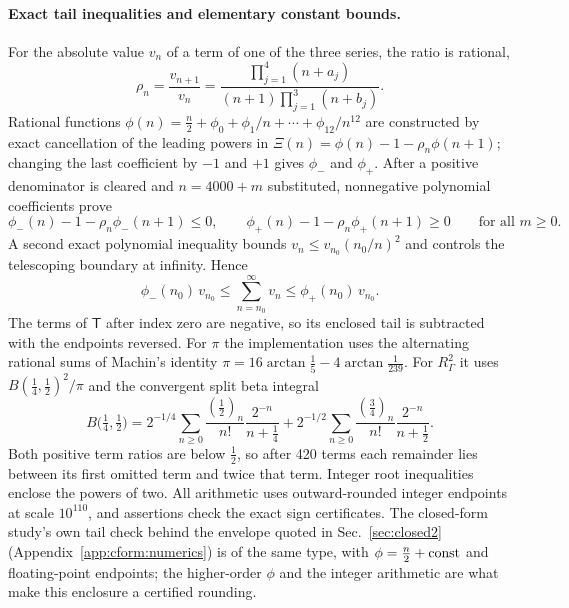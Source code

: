 \documentclass[11pt,a4paper]{article}
\numberwithin{equation}{section}
\begin{document}
\paragraph{Exact tail inequalities and elementary constant bounds.} For the absolute value $v_n$ of a term of one of
the three series, the ratio is rational,
\begin{equation}
 \rho_n=\frac{v_{n+1}}{v_n}=\frac{\prod_{j=1}^4(n+a_j)}{(n+1)\prod_{j=1}^3(n+b_j)}.
\end{equation}
Rational functions $\phi(n)=\frac n2+\phi_0+\phi_1/n+\cdots+\phi_{12}/n^{12}$ are constructed by exact cancellation of
the leading powers in $\Xi(n)=\phi(n)-1-\rho_n\phi(n+1)$; changing the last coefficient by $-1$ and $+1$ gives $\phi_-$
and $\phi_+$. After a positive denominator is cleared and $n=4000+m$ substituted, nonnegative polynomial coefficients
prove
\begin{equation}
 \phi_-(n)-1-\rho_n\phi_-(n+1)\le0,\qquad \phi_+(n)-1-\rho_n\phi_+(n+1)\ge0\qquad\text{for all }m\ge0.
\end{equation}
A second exact polynomial inequality bounds $v_n\le v_{n_0}(n_0/n)^2$ and controls the telescoping boundary at
infinity. Hence
\begin{equation}
 \phi_-(n_0)\,v_{n_0}\le\sum_{n=n_0}^\infty v_n\le\phi_+(n_0)\,v_{n_0}.
\end{equation}
The terms of $\mathsf T$ after index zero are negative, so its enclosed tail is subtracted with the endpoints reversed.
For $\pi$ the implementation uses the alternating rational sums of Machin's identity
$\pi=16\arctan\frac15-4\arctan\frac1{239}$. For $R_\Gamma^2$ it uses $B(\frac14,\frac12)^2/\pi$ and the convergent split
beta integral
\begin{equation}
 B\bigl(\tfrac14,\tfrac12\bigr)=2^{-1/4}\sum_{n\ge0}\frac{(\frac12)_n}{n!}\frac{2^{-n}}{n+\frac14}
 +2^{-1/2}\sum_{n\ge0}\frac{(\frac34)_n}{n!}\frac{2^{-n}}{n+\frac12}.
\end{equation}
Both positive term ratios are below $\frac12$, so after 420 terms each remainder lies between its first omitted term and
twice that term. Integer root inequalities enclose the powers of two. All arithmetic uses outward-rounded integer
endpoints at scale $10^{110}$, and assertions check the exact sign certificates. The closed-form study's own tail check behind the envelope quoted in Sec.~\ref{sec:closed2} (Appendix~\ref{app:cform:numerics}) is of the same
type, with $\phi=\frac n2+{\rm const}$ and floating-point endpoints; the higher-order $\phi$ and the integer arithmetic
are what make this enclosure a certified rounding.
\end{document}

